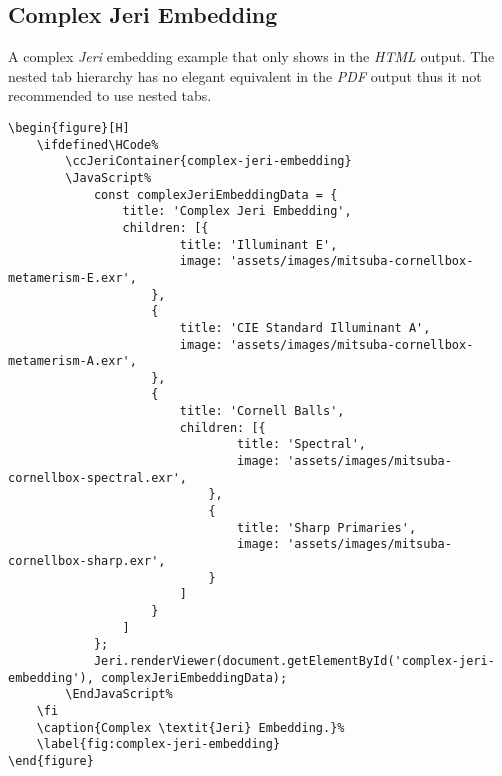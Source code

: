 \subsection*{Complex Jeri Embedding}%

A complex \textit{Jeri} embedding example that only shows in the \textit{HTML} output.
The nested tab hierarchy has no elegant equivalent in the \textit{PDF} output thus it not recommended to use nested tabs.

\begin{lstlisting}[caption={Complex \textit{Jeri} Embedding.}]
\begin{figure}[H]
    \ifdefined\HCode%
        \ccJeriContainer{complex-jeri-embedding}
        \JavaScript%
            const complexJeriEmbeddingData = {
                title: 'Complex Jeri Embedding',
                children: [{
                        title: 'Illuminant E',
                        image: 'assets/images/mitsuba-cornellbox-metamerism-E.exr',
                    },
                    {
                        title: 'CIE Standard Illuminant A',
                        image: 'assets/images/mitsuba-cornellbox-metamerism-A.exr',
                    },
                    {
                        title: 'Cornell Balls',
                        children: [{
                                title: 'Spectral',
                                image: 'assets/images/mitsuba-cornellbox-spectral.exr',
                            },
                            {
                                title: 'Sharp Primaries',
                                image: 'assets/images/mitsuba-cornellbox-sharp.exr',
                            }
                        ]
                    }
                ]
            };
            Jeri.renderViewer(document.getElementById('complex-jeri-embedding'), complexJeriEmbeddingData);
        \EndJavaScript%
    \fi
    \caption{Complex \textit{Jeri} Embedding.}%
    \label{fig:complex-jeri-embedding}
\end{figure}
\end{lstlisting}

